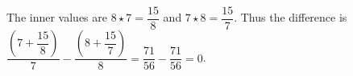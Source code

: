 The inner values are $8\star7=\dfrac{15}{8}$ and $7\star8=\dfrac{15}{7}$. Thus the difference is $\dfrac{(7+\dfrac{15}{8})}{7}-\dfrac{(8+\dfrac{15}{7})}{8}=\dfrac{71}{56}-\dfrac{71}{56}=\boxed0$.
